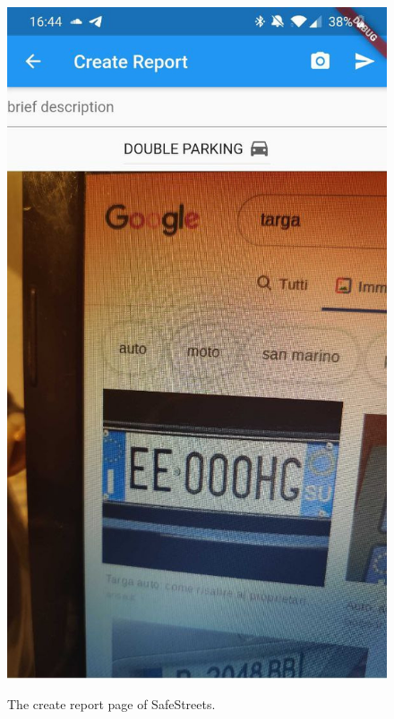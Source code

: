 \documentclass[../RASD.tex]{subfiles}
\begin{document}
    \begin{figure}[H]
        \centering
        \includegraphics[scale = 0.2]{assets/app_screenshots/create.jpg}\\
        \caption[\textit{Create Report} Screenshot]{The create report page of SafeStreets.}
    \end{figure}
\end{document}
